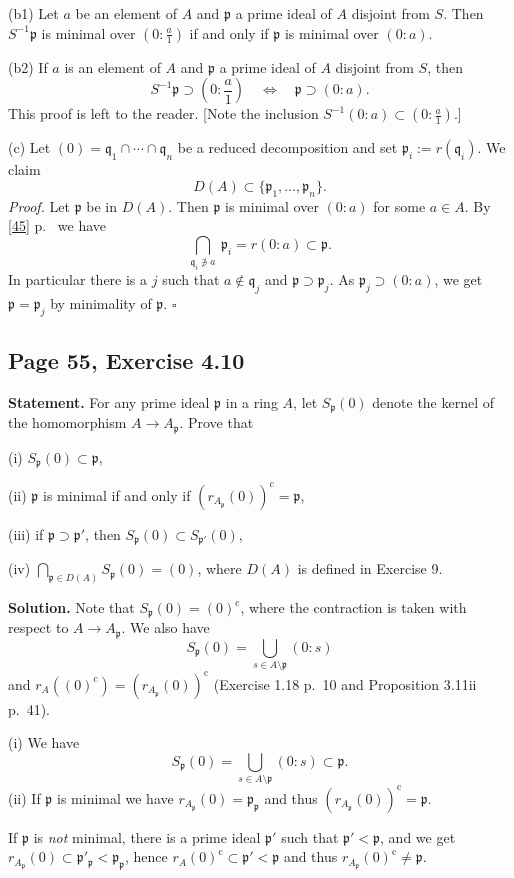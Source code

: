 \documentclass[parskip=half,fontsize=12pt]{scrartcl}%
\newcommand{\oo}{\operatorname}\newcommand{\ooo}{\operatorname*}
\newcommand{\mf}{\mathfrak}
\newcommand{\ppp}{\mf p}
\newcommand{\qqq}{\mf q}
\begin{document}
(b1) Let $a$ be an element of $A$ and $\ppp$ a prime ideal of $A$ disjoint from $S$. Then $S^{-1}\ppp$ is minimal over $(0:\frac a1)$ if and only if $\ppp$ is minimal over $(0:a)$.

(b2) If $a$ is an element of $A$ and $\ppp$ a prime ideal of $A$ disjoint from $S$, then 
$$
S^{-1}\ppp\supset\left(0:\frac a1\right)\quad\iff\quad\ppp\supset(0:a).
$$
This proof is left to the reader. [Note the inclusion $S^{-1}(0:a)\subset(0:\frac a1)$.]

(c) Let $(0)=\qqq_1\cap\cdots\cap\qqq_n$ be a reduced decomposition and set $\ppp_i:=r(\qqq_i)$. We claim 
$$
D(A)\subset\{\ppp_1,\dots,\ppp_n\}.
$$ 
\emph{Proof.} Let $\ppp$ be in $D(A)$. Then $\ppp$ is minimal over $(0:a)$ for some $a\in A$. By \eqref{45} p.~\pageref{45} we have 
$$
\bigcap_{\qqq_i\not\ni a}\ \ppp_i=r(0:a)\subset\ppp.
$$ 
In particular there is a $j$ such that $a\notin\qqq_j$ and $\ppp\supset\ppp_j$. As $\ppp_j\supset(0:a)$, we get $\ppp=\ppp_j$ by minimality of $\ppp$. $\square$

\subsection{Page 55, Exercise 4.10}\label{4.10}%

\textbf{Statement.} For any prime ideal $\ppp$ in a ring $A$, let $S_\ppp(0)$ denote the kernel of the homomorphism $A\to A_\ppp$. Prove that

(i) $S_\ppp(0)\subset\ppp$,

(ii) $\ppp$ is minimal if and only if $(r_{A_\ppp}(0))^{\oo c}=\ppp$,

(iii) if $\ppp\supset\ppp'$, then $S_\ppp(0)\subset S_{\ppp'}(0)$,

(iv) $\bigcap_{\ppp\in D(A)}S_\ppp(0)=(0)$, where $D(A)$ is defined in Exercise 9.

\textbf{Solution.} Note that $S_\ppp(0)=(0)^{\oo c}$, where the contraction is taken with respect to $A\to A_\ppp$. We also have 
$$
S_\ppp(0)=\bigcup_{s\in A\setminus\ppp}(0:s)
$$ 
and $r_A((0)^{\oo c})=(r_{A_\ppp}(0))^{\oo c}$ (Exercise 1.18 p.~10 and Proposition 3.11ii p.~41).

(i) We have 
$$
S_\ppp(0)=\bigcup_{s\in A\setminus\ppp}(0:s)\subset\ppp.
$$
(ii) If $\ppp$ is minimal we have $r_{A_\ppp}(0)=\ppp_\ppp$ and thus $(r_{A_\ppp}(0))^{\oo c}=\ppp$. 

If $\ppp$ is \emph{not} minimal, there is a prime ideal $\ppp'$ such that $\ppp'<\ppp$, and we get $r_{A_\ppp}(0)\subset\ppp'_\ppp<\ppp_\ppp$, hence $r_A(0)^{\oo c}\subset\ppp'<\ppp$ and thus $r_{A_\ppp}(0)^{\oo c}\ne\ppp$.
\end{document}

